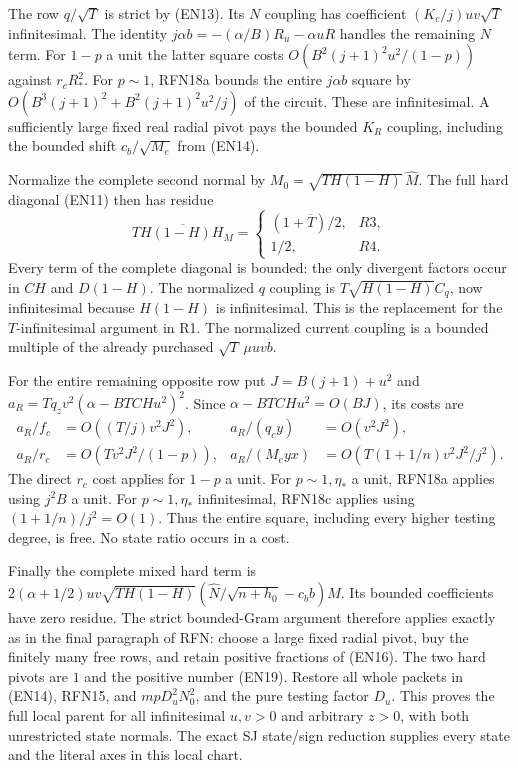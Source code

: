 The row $q/\sqrt T$ is strict by (EN13).
Its $N$ coupling has coefficient $(K_c/j)uv\sqrt T$ infinitesimal.
The identity $j\alpha b=-(\alpha/B)R_u-\alpha uR$ handles
the remaining $N$ term. For $1-p$ a unit the latter square costs
$O(B^2(j+1)^2u^2/(1-p))$ against $r_cR_*^2$.
For $p\sim1$, RFN18a bounds the entire $j\alpha b$ square by
$O(B^3(j+1)^2+B^2(j+1)^2u^2/j)$ of the circuit.
These are infinitesimal. A sufficiently large fixed real radial
pivot pays the bounded $K_R$ coupling, including the bounded shift
$c_b/\sqrt{M_e}$ from (EN14).

Normalize the complete second normal by
$M_0=\sqrt{TH(1-H)}\,\widehat M$. The full hard diagonal (EN11)
then has residue
\[
\overline{TH(1-H)H_M}=
\begin{cases}
(1+\overline T)/2,&R3,\\
1/2,&R4 .
\end{cases}                                                    \tag{EN19}
\]
Every term of the complete diagonal is bounded: the only divergent
factors occur in $CH$ and $D(1-H)$.
The normalized $q$ coupling is
$T\sqrt{H(1-H)}C_q$, now infinitesimal because
$H(1-H)$ is infinitesimal. This is the replacement for the
$T$-infinitesimal argument in R1.
The normalized current coupling is a bounded multiple of the
already purchased $\sqrt T\,\mu uvb$.

For the entire remaining opposite row put $J=B(j+1)+u^2$ and
$a_R=Tq_zv^2(\alpha-BTCHu^2)^2$.
Since $\alpha-BTCHu^2=O(BJ)$, its costs are
\[
\begin{aligned}
a_R/f_c&=O((T/j)v^2J^2),&
a_R/(q_cy)&=O(v^2J^2),\\
a_R/r_c&=O(Tv^2J^2/(1-p)),&
a_R/(M_eyx)&=O(T(1+1/n)v^2J^2/j^2).
\end{aligned}                                                    \tag{EN20}
\]
The direct $r_c$ cost applies for $1-p$ a unit.
For $p\sim1,\eta_*$ a unit, RFN18a applies using $j^2B$ a unit.
For $p\sim1,\eta_*$ infinitesimal, RFN18c applies using
$(1+1/n)/j^2=O(1)$. Thus the entire square, including every
higher testing degree, is free. No state ratio occurs in a cost.

Finally the complete mixed hard term is
$2(\alpha+1/2)uv\sqrt{TH(1-H)}
(\widehat N/\sqrt{n+h_0}-c_bb)\widehat M$.
Its bounded coefficients have zero residue.
The strict bounded-Gram argument therefore applies exactly as in
the final paragraph of RFN: choose a large fixed radial pivot, buy
the finitely many free rows, and retain positive fractions of
(EN16). The two hard pivots are $1$ and the positive number
(EN19). Restore all whole packets in (EN14), RFN15, and
$mpD_u^2N_0^2$, and the pure testing factor $D_u$.
This proves the full local parent for all infinitesimal $u,v>0$
and arbitrary $z>0$, with both unrestricted state normals.
The exact SJ state/sign reduction supplies every state and the
literal axes in this local chart.

